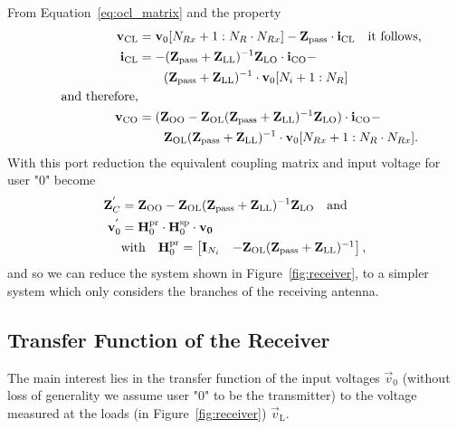 From Equation~\eqref{eq:ocl_matrix} and the property
\begin{align}
\mathbf{v}_\text{CL} &= \mathbf{v}_0[N_{Rx}+1:N_R\cdot N_{Rx}]-\mathbf{Z}_{\text{pass}}\cdot\mathbf{i}_\text{CL}\quad\text{it follows,}\\
\mathbf{i}_\text{CL} &= -(\mathbf{Z}_{\text{pass}} + \mathbf{Z}_\text{LL})^{-1}\mathbf{Z}_\text{LO}\cdot\mathbf{i}_\text{CO} -\\\nonumber
&\qquad (\mathbf{Z}_{\text{pass}} + \mathbf{Z}_\text{LL})^{-1}\cdot\mathbf{v}_{0}[N_i+1:N_R]\\\nonumber\quad\text{and therefore,}&\\
\mathbf{v}_\text{CO} &= (\mathbf{Z}_\text{OO}-\mathbf{Z}_\text{OL}(\mathbf{Z}_{\text{pass}} + \mathbf{Z}_\text{LL})^{-1}\mathbf{Z}_\text{LO})\cdot\mathbf{i}_\text{CO} -\\\nonumber&\qquad \mathbf{Z}_\text{OL}(\mathbf{Z}_{\text{pass}} + \mathbf{Z}_\text{LL})^{-1}\cdot\mathbf{v}_0[N_{Rx}+1:N_R\cdot N_{Rx}].
\end{align}
With this port reduction the equivalent coupling matrix and input voltage for user "0" become
\begin{align}
\label{eq:port_reduction}
\mathbf{Z}_C^{'}&= \mathbf{Z}_\text{OO} - \mathbf{Z}_\text{OL}(\mathbf{Z}_{\text{pass}} + \mathbf{Z}_\text{LL})^{-1}\mathbf{Z}_\text{LO}\quad\text{and}\\
\mathbf{v}_0^{'} &= \mathbf{H}_0^{\text{pr}} \cdot\mathbf{H}_{0}^{\text{sp}}\cdot \mathbf{v_0}\\\nonumber
&\text{with}\quad\mathbf{H}_0^{\text{pr}}=
\begin{bmatrix}
\mathbf{I}_{N_i} & -\mathbf{Z}_\text{OL}(\mathbf{Z}_{\text{pass}} + \mathbf{Z}_\text{LL})^{-1}
\end{bmatrix},
\end{align}
and so we can reduce the system shown in Figure~\ref{fig:receiver}, to a simpler system which only considers the branches of the receiving antenna.











\subsection{Transfer Function of the Receiver}
\label{sec:transf}
The main interest lies in the transfer function of the input voltages $\vec{v}_0$ (without loss of generality we assume user "0" to be the transmitter) to the voltage measured at the loads (in Figure~\ref{fig:receiver}) $\vec{v}_\text{L}$.

